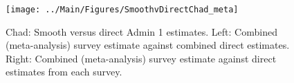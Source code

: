 \documentclass[12pt]{article}\usepackage[]{graphicx}\usepackage[]{color}
\newenvironment{knitrout}{}{} %
\begin{document}

\begin{knitrout}
\color{fgcolor}\begin{figure}[bht]

{\centering \texttt{[image: ../Main/Figures/SmoothvDirectChad\_meta]} 

}

\caption[Chad]{Chad: Smooth versus direct Admin 1 estimates. Left: Combined (meta-analysis) survey estimate against combined direct estimates. Right: Combined (meta-analysis) survey estimate against direct estimates from each survey.}\label{fig:unnamed-chunk-53}
\end{figure}


\end{knitrout}
\end{document}
